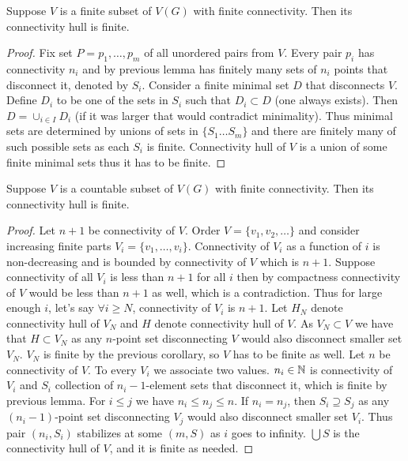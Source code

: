 \documentclass{amsart}
\begin{document}
\begin{Corollary}
	Suppose $V$ is a finite subset of $V(G)$ with finite connectivity. Then its connectivity hull is finite.
\end{Corollary}

\begin{proof}
	Fix set $P = {p_1, \ldots, p_m}$ of all unordered pairs from $V$. Every pair $p_i$ has connectivity $n_i$ and by previous lemma has finitely many sets of $n_i$ points that disconnect it, denoted by $S_i$. Consider a finite minimal set $D$ that disconnects $V$. Define $D_i$ to be one of the sets in $S_i$ such that $D_i \subset D$ (one always exists). Then $D = \cup_{i \in I} D_i$ (if it was larger that would contradict minimality). Thus minimal sets are determined by unions of sets in $\{S_1 \ldots S_m\}$ and there are finitely many of such possible sets as each $S_i$ is finite. Connectivity hull of $V$ is a union of some finite minimal sets thus it has to be finite.
\end{proof}

\begin{Corollary}
	Suppose $V$ is a countable subset of $V(G)$ with finite connectivity. Then its connectivity hull is finite.
\end{Corollary}

\begin{proof}
	Let $n+1$ be connectivity of $V$. Order $V = \{v_1, v_2, \ldots\}$ and consider increasing finite parts $V_i = \{v_1, \dots, v_i\}$. Connectivity of $V_i$ as a function of $i$ is non-decreasing and is bounded by connectivity of $V$ which is $n+1$. Suppose connectivity of all $V_i$ is less than $n+1$ for all $i$ then by compactness connectivity of $V$ would be less than $n+1$ as well, which is a contradiction. Thus for large enough $i$, let's say $\forall i \geq N$, connectivity of $V_i$ is $n+1$. Let $H_N$ denote connectivity hull of $V_N$ and $H$ denote connectivity hull of $V$. As $V_N \subset V$ we have that $H \subset V_N$ as any $n$-point set disconnecting $V$ would also disconnect smaller set $V_N$. $V_N$ is finite by the previous corollary, so $V$ has to be finite as well.
	Let $n$ be connectivity of $V$.
	To every $V_i$ we associate two values. $n_i \in \mathbb{N}$ is connectivity of $V_i$ and $S_i$ collection of $n_i-1$-element sets that disconnect it, which is finite by previous lemma. For $i \leq j$ we have $n_i \leq n_j \leq n$. If $n_i = n_j$, then $S_i \supseteq S_j$ as any $(n_i-1)$-point set disconnecting $V_j$ would also disconnect smaller set $V_i$. Thus pair $(n_i, S_i)$ stabilizes at some $(m, S)$ as $i$ goes to infinity. $\bigcup S$ is the connectivity hull of $V$, and it is finite as needed.
\end{proof}
\end{document}
